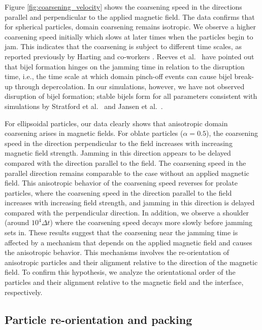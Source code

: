 Figure \ref{fig:coarsening_velocity} shows the coarsening speed in the directions parallel and perpendicular to the applied magnetic field. The data confirms that for spherical particles, domain coarsening remains isotropic. We observe a higher coarsening speed initially which slows at later times when the particles begin to jam. This indicates that the
coarsening is subject to different time scales, as reported previously
by Harting and co-workers \cite{gunther_timescales_2014}. Reeves et
al.~\cite{reeves_particle-size_2015} have pointed out that bijel
formation hinges on the jamming time in relation to the disruption time, i.e., the time scale at which domain pinch-off events can cause bijel break-up through depercolation. In our simulations, however, we have not observed disruption of bijel formation; stable bijels form for all parameters consistent with simulations by Stratford et
al.~\cite{stratford_colloidal_2005} and Jansen et al.~\cite{jansen_bijels_2011}.

For ellipsoidal particles, our data clearly shows that an\-isotropic
domain coarsening arises in magnetic fields.  For oblate particles
(\(\alpha=0.5\)), the coarsening speed in the direction perpendicular
to the field increases with increasing magnetic field strength.
Jamming in this direction appears to be delayed compared with the
direction parallel to the field. The coarsening speed in the parallel
direction remains comparable to the case without an applied magnetic
field. This anisotropic behavior of the coarsening speed reverses for
prolate particles, where the coarsening speed in the direction parallel to the field increases with increasing field strength, and jamming in this direction
is delayed compared with the perpendicular direction. In addition, we observe a shoulder (around \(10^4\Delta t\)) where the coarsening speed decays more slowly before jamming sets in. These results suggest that the coarsening near the jamming time is affected by a mechanism that depends on the applied magnetic field and causes the anisotropic
behavior. This mechanisms involves the re-orientation of anisotropic
particles and their alignment relative to the direction of the
magnetic field. To confirm this hypothesis, we analyze the
orientational order of the particles and their alignment relative to
the magnetic field and the interface, respectively.

\subsection{Particle re-orientation and packing}

